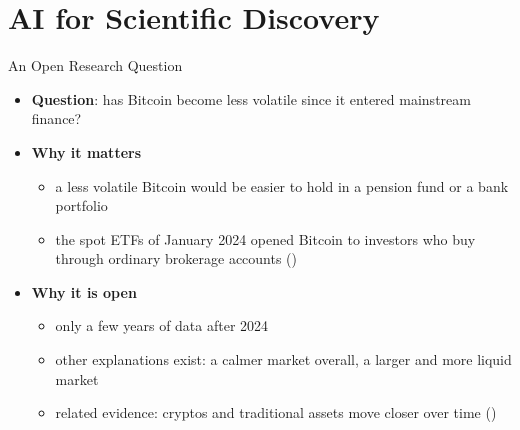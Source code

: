 \section{AI for Scientific Discovery}

\begin{frame}{An Open Research Question}
\itemsize{\small}
\begin{itemize}
    \item \textbf{Question}: has Bitcoin become less volatile since it entered mainstream finance?
    \item \textbf{Why it matters}
    \begin{itemize}
        \item a less volatile Bitcoin would be easier to hold in a pension fund or a bank portfolio
        \item the spot ETFs of January 2024 opened Bitcoin to investors who buy through ordinary brokerage accounts ()
    \end{itemize}
    \item \textbf{Why it is open}
    \begin{itemize}
        \item only a few years of data after 2024
        \item other explanations exist: a calmer market overall, a larger and more liquid market
        \item related evidence: cryptos and traditional assets move closer over time ()
    \end{itemize}
\end{itemize}
\end{frame}

